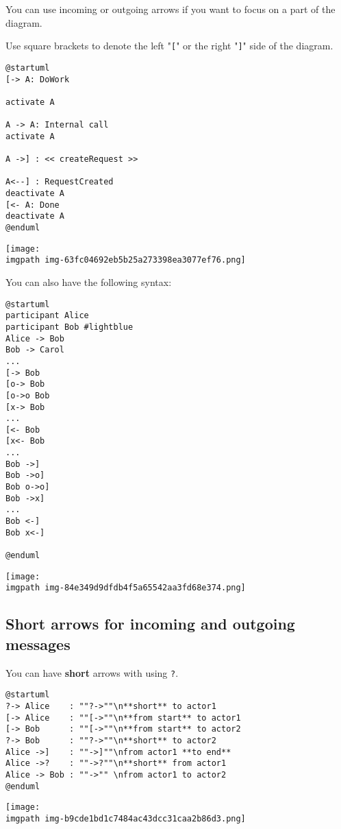 You can use incoming or outgoing arrows if you want to focus on a part
of the diagram.


Use square brackets to denote the left "\texttt{[}" or the
right "\texttt{]}" side of the diagram.
\begin{verbatim}
@startuml
[-> A: DoWork

activate A

A -> A: Internal call
activate A

A ->] : << createRequest >>

A<--] : RequestCreated
deactivate A
[<- A: Done
deactivate A
@enduml
\end{verbatim}
\begin{center}
\texttt{[image: \\imgpath img-63fc04692eb5b25a273398ea3077ef76.png]}
\end{center}




You can also have the following syntax:
\begin{verbatim}
@startuml
participant Alice
participant Bob #lightblue
Alice -> Bob
Bob -> Carol
...
[-> Bob
[o-> Bob
[o->o Bob
[x-> Bob
...
[<- Bob
[x<- Bob
...
Bob ->]
Bob ->o]
Bob o->o]
Bob ->x]
...
Bob <-]
Bob x<-]

@enduml
\end{verbatim}
\begin{center}
\texttt{[image: \\imgpath img-84e349d9dfdb4f5a65542aa3fd68e374.png]}
\end{center}
%
%
\subsection{Short arrows for incoming and outgoing messages}


You can have \textbf{short} arrows with using \texttt{?}.


\begin{verbatim}
@startuml
?-> Alice    : ""?->""\n**short** to actor1
[-> Alice    : ""[->""\n**from start** to actor1
[-> Bob      : ""[->""\n**from start** to actor2
?-> Bob      : ""?->""\n**short** to actor2
Alice ->]    : ""->]""\nfrom actor1 **to end**
Alice ->?    : ""->?""\n**short** from actor1
Alice -> Bob : ""->"" \nfrom actor1 to actor2
@enduml
\end{verbatim}
\begin{center}
\texttt{[image: \\imgpath img-b9cde1bd1c7484ac43dcc31caa2b86d3.png]}
\end{center}


